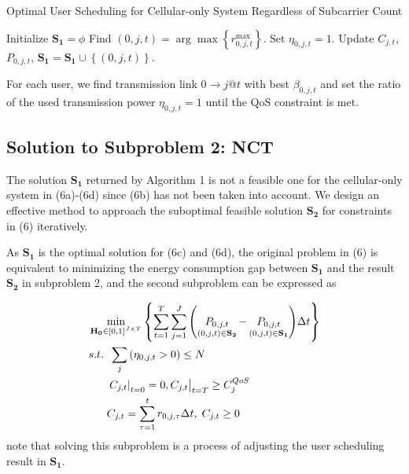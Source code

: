 \documentclass{ieeeaccess}
\begin{document}
\begin{algorithm}[h]
\caption{Optimal User Scheduling for Cellular-only System Regardless of Subcarrier Count}
\label{alg:1}
\begin{algorithmic}[1]
\STATE Initialize ${{\mathbf{S}}_{\mathbf{1}}}=\phi$
    \STATE Find $\left( {0,j,t} \right) = \arg \max \left\{ {r_{0,j,t}^{\max }} \right\}$.
    \STATE Set ${\eta _{0,j,t}} = 1$.
    \STATE Update ${C_{j,t}}$, ${P_{0,j,t}}$, ${{\mathbf{S}}_{\mathbf{1}}}={{\mathbf{S}}_{\mathbf{1}}} \cup \left\{ {\left( {0,j,t} \right)} \right\}$.
  \ENDWHILE
\ENDFOR
\end{algorithmic}
\end{algorithm}

For each user, we find transmission link $0 \to j@t$ with best ${\beta _{0,j,t}}$ and set the ratio of the used transmission power ${\eta _{0,j,t} = 1}$ until the QoS constraint is met.


\subsection{Solution to \textbf{Subproblem 2: NCT}}

The solution ${{\mathbf{S}}_{\mathbf{1}}}$ returned by Algorithm 1 is not a feasible one for the cellular-only system in (6a)-(6d) since (6b) has not been taken into account. We design an effective method to approach the suboptimal feasible solution ${{\mathbf{S}}_{\mathbf{2}}}$ for constraints in (6) iteratively.

As ${{\mathbf{S}}_{\mathbf{1}}}$ is the optimal solution for (6c) and (6d), the original problem in (6) is equivalent to minimizing the energy consumption gap between ${{\mathbf{S}}_{\mathbf{1}}}$ and the result ${{\mathbf{S}}_{\mathbf{2}}}$ in subproblem 2, and the second subproblem can be expressed as

\begin{subequations}
\begin{align}
& \mathop {\min }\limits_{{{\mathbf{{\rm H}}}_{\mathbf{0}}} \in {{\left[ {0,1} \right]}^{J \times T}}} \left\{ {\sum\limits_{t = 1}^T {\sum\limits_{j = 1}^J {\left( {\mathop {{P_{0,j,t}}}\limits_{\left( {0,j,t} \right) \in {{\mathbf{S}}_{\mathbf{2}}}}  - \mathop {{P_{0,j,t}}}\limits_{\left( {0,j,t} \right) \in {{\mathbf{S}}_{\mathbf{1}}}} } \right)} \Delta t} } \right\} \\
& {s.t.} \;\; \sum\limits_j  {\left( {{\eta _{0,j,t}} > 0} \right)}  \le N \\
& \;\;\;\;\;\; {\left. {{{\left. {{C_{j,t}}} \right|}_{t = 0}} = 0, {C_{j,t}}} \right|_{t = T}} \ge C_j^{QoS} \\
& \;\;\;\;\;\; {C_{j,t}} = \sum\limits_{\tau  = 1}^t {{r_{0,j,\tau }}\Delta t} ,\; {C_{j,t}} \ge 0
\end{align}
\end{subequations}
note that solving this subproblem is a process of adjusting the user scheduling result in ${{\mathbf{S}}_{\mathbf{1}}}$.
\end{document}
